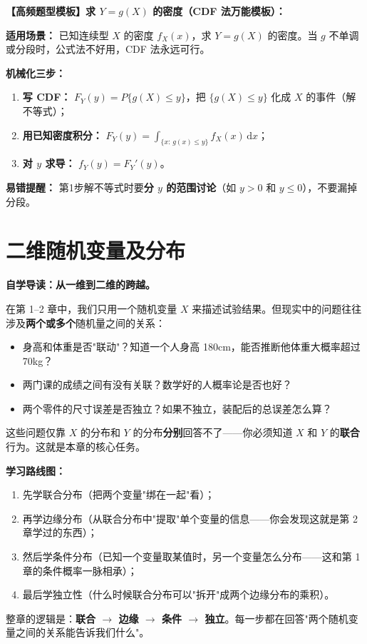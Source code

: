 ﻿\documentclass[lang=cn,11pt]{elegantbook}
\begin{document}
\begin{note}
\textbf{【高频题型模板】求 $Y=g(X)$ 的密度（CDF 法万能模板）：}

\textbf{适用场景：} 已知连续型 $X$ 的密度 $f_X(x)$，求 $Y=g(X)$ 的密度。当 $g$ 不单调或分段时，公式法不好用，CDF 法永远可行。

\textbf{机械化三步：}
\begin{enumerate}
    \item \textbf{写 CDF：} $F_Y(y)=P\{g(X)\leq y\}$，把 $\{g(X)\leq y\}$ 化成 $X$ 的事件（解不等式）；
    \item \textbf{用已知密度积分：} $F_Y(y)=\displaystyle\int_{\{x:\,g(x)\leq y\}} f_X(x)\,\mathrm{d}x$；
    \item \textbf{对 $y$ 求导：} $f_Y(y)=F_Y'(y)$。
\end{enumerate}
\textbf{易错提醒：} 第1步解不等式时要\textbf{分 $y$ 的范围讨论}（如 $y>0$ 和 $y\leq 0$），不要漏掉分段。
\end{note}


\chapter{二维随机变量及分布}

\begin{note}
\textbf{自学导读：从一维到二维的跨越。}

在第 1--2 章中，我们只用一个随机变量 $X$ 来描述试验结果。但现实中的问题往往涉及\textbf{两个或多个}随机量之间的关系：
\begin{itemize}
    \item 身高和体重是否"联动"？知道一个人身高 180cm，能否推断他体重大概率超过 70kg？
    \item 两门课的成绩之间有没有关联？数学好的人概率论是否也好？
    \item 两个零件的尺寸误差是否独立？如果不独立，装配后的总误差怎么算？
\end{itemize}
这些问题仅靠 $X$ 的分布和 $Y$ 的分布\textbf{分别}回答不了——你必须知道 $X$ 和 $Y$ 的\textbf{联合}行为。这就是本章的核心任务。

\textbf{学习路线图：}
\begin{enumerate}
    \item 先学联合分布（把两个变量"绑在一起"看）；
    \item 再学边缘分布（从联合分布中"提取"单个变量的信息——你会发现这就是第 2 章学过的东西）；
    \item 然后学条件分布（已知一个变量取某值时，另一个变量怎么分布——这和第 1 章的条件概率一脉相承）；
    \item 最后学独立性（什么时候联合分布可以"拆开"成两个边缘分布的乘积）。
\end{enumerate}
整章的逻辑是：\textbf{联合 $\to$ 边缘 $\to$ 条件 $\to$ 独立}。每一步都在回答"两个随机变量之间的关系能告诉我们什么"。
\end{note}
\end{document}
